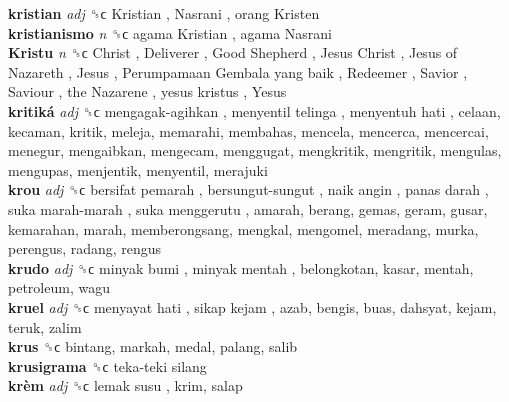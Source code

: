 \textbf{kristian} \emph{adj}  ␝ϲ   Kristian ,  Nasrani ,  orang Kristen   \\
\textbf{kristianismo} \emph{n}  ␝ϲ   agama Kristian ,  agama Nasrani   \\
\textbf{Kristu} \emph{n}  ␝ϲ   Christ ,  Deliverer ,  Good Shepherd ,  Jesus Christ ,  Jesus of Nazareth ,  Jesus ,  Perumpamaan Gembala yang baik ,  Redeemer ,  Savior ,  Saviour ,  the Nazarene ,  yesus kristus ,  Yesus   \\
\textbf{kritiká} \emph{adj}  ␝ϲ   mengagak-agihkan ,  menyentil telinga ,  menyentuh hati , celaan, kecaman, kritik, meleja, memarahi, membahas, mencela, mencerca, mencercai, menegur, mengaibkan, mengecam, menggugat, mengkritik, mengritik, mengulas, mengupas, menjentik, menyentil, merajuki  \\
\textbf{krou} \emph{adj}  ␝ϲ   bersifat pemarah ,  bersungut-sungut ,  naik angin ,  panas darah ,  suka marah-marah ,  suka menggerutu , amarah, berang, gemas, geram, gusar, kemarahan, marah, memberongsang, mengkal, mengomel, meradang, murka, perengus, radang, rengus  \\
\textbf{krudo} \emph{adj}  ␝ϲ   minyak bumi ,  minyak mentah , belongkotan, kasar, mentah, petroleum, wagu  \\
\textbf{kruel} \emph{adj}  ␝ϲ   menyayat hati ,  sikap kejam , azab, bengis, buas, dahsyat, kejam, teruk, zalim  \\
\textbf{krus} ␝ϲ  bintang, markah, medal, palang, salib  \\
\textbf{krusigrama} ␝ϲ   teka-teki silang   \\
\textbf{krèm} \emph{adj}  ␝ϲ   lemak susu , krim, salap  \\
